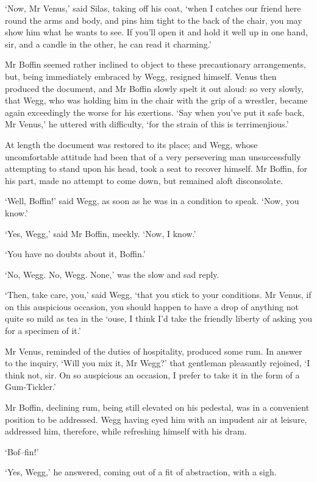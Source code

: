 ‘Now, Mr Venus,’ said Silas, taking off his coat, ‘when I catches our
friend here round the arms and body, and pins him tight to the back of
the chair, you may show him what he wants to see. If you’ll open it and
hold it well up in one hand, sir, and a candle in the other, he can read
it charming.’

Mr Boffin seemed rather inclined to object to these precautionary
arrangements, but, being immediately embraced by Wegg, resigned himself.
Venus then produced the document, and Mr Boffin slowly spelt it out
aloud: so very slowly, that Wegg, who was holding him in the chair
with the grip of a wrestler, became again exceedingly the worse for his
exertions. ‘Say when you’ve put it safe back, Mr Venus,’ he uttered with
difficulty, ‘for the strain of this is terrimenjious.’

At length the document was restored to its place; and Wegg, whose
uncomfortable attitude had been that of a very persevering man
unsuccessfully attempting to stand upon his head, took a seat to recover
himself. Mr Boffin, for his part, made no attempt to come down, but
remained aloft disconsolate.

‘Well, Boffin!’ said Wegg, as soon as he was in a condition to speak.
‘Now, you know.’

‘Yes, Wegg,’ said Mr Boffin, meekly. ‘Now, I know.’

‘You have no doubts about it, Boffin.’

‘No, Wegg. No, Wegg. None,’ was the slow and sad reply.

‘Then, take care, you,’ said Wegg, ‘that you stick to your conditions.
Mr Venus, if on this auspicious occasion, you should happen to have a
drop of anything not quite so mild as tea in the ‘ouse, I think I’d take
the friendly liberty of asking you for a specimen of it.’

Mr Venus, reminded of the duties of hospitality, produced some rum.
In answer to the inquiry, ‘Will you mix it, Mr Wegg?’ that gentleman
pleasantly rejoined, ‘I think not, sir. On so auspicious an occasion, I
prefer to take it in the form of a Gum-Tickler.’

Mr Boffin, declining rum, being still elevated on his pedestal, was in
a convenient position to be addressed. Wegg having eyed him with an
impudent air at leisure, addressed him, therefore, while refreshing
himself with his dram.

‘Bof--fin!’

‘Yes, Wegg,’ he answered, coming out of a fit of abstraction, with a
sigh.

